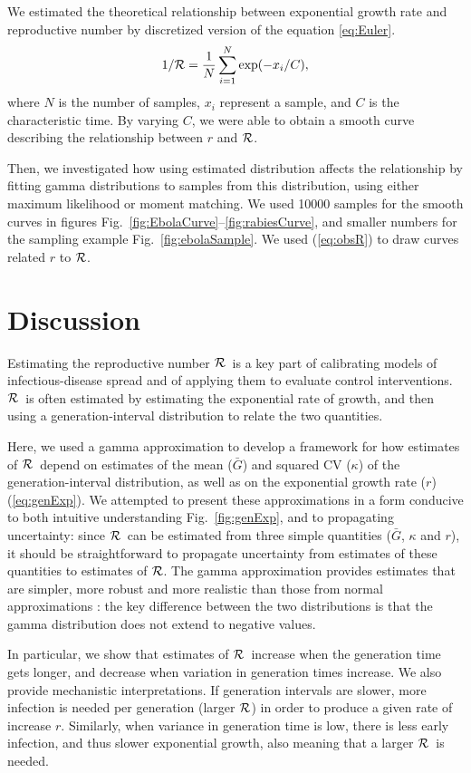 \documentclass[12pt,]{article}
\newcommand{\RR}{\ensuremath{{\cal R}}}
\newcommand{\eref}[1]{(\ref{eq:#1})}
\newcommand{\fref}[1]{Fig.~\ref{fig:#1}}
\newcommand{\frange}[2]{Fig.~\ref{fig:#1}--\ref{fig:#2}}
\begin{document}
We estimated the theoretical relationship between exponential growth rate and reproductive number by discretized version of the equation \ref{eq:Euler}.
\begin{equation}
1/\RR = \frac{1}{N} \sum_{i=1}^{N} \exp(-x_i/C),
\label{eq:obsR}
\end{equation}
where $N$ is the number of samples, $x_i$ represent a sample, and $C$ is the characteristic time. By varying $C$, we were able to obtain a smooth curve describing the relationship between $r$ and $\RR$.

Then, we investigated how using estimated distribution affects the relationship by fitting gamma distributions to samples from this distribution, using either maximum likelihood or moment matching. We used 10000 samples for the smooth curves in figures \frange{EbolaCurve}{rabiesCurve}, and smaller numbers for the sampling example \fref{ebolaSample}. We used \eref{obsR} to draw curves related $r$ to $\RR$.

\section{Discussion}

Estimating the reproductive number \RR\ is a key part of calibrating models of infectious-disease spread and of applying them to evaluate control interventions. \RR\ is often estimated by estimating the exponential rate of growth, and then using a generation-interval distribution to relate the two quantities. 

Here, we used a gamma approximation \cite{NishCast09} to develop a framework for how estimates of \RR\ depend on estimates of the mean ($\bar G$) and squared CV ($\kappa$) of the generation-interval distribution, as well as on the exponential growth rate ($r$) \eref{genExp}. 
We attempted to present these approximations in a form conducive to both intuitive understanding \fref{genExp}, and to propagating uncertainty: since \RR\ can be estimated from three simple quantities ($\bar G$, $\kappa$ and $r$), it should be straightforward to propagate uncertainty from estimates of these quantities to estimates of \RR.
The gamma approximation provides estimates that are simpler, more robust and more realistic than those from normal approximations \cite{WallLips07}:
the key difference between the two distributions is that the gamma distribution does not extend to negative values.

In particular, we show that estimates of \RR\ increase when the generation time gets longer, and decrease when variation in generation times increase. We also provide mechanistic interpretations. If generation intervals are slower, more infection is needed per generation (larger \RR)  in order to produce a given rate of increase $r$. Similarly, when variance in generation time is low, there is less early infection, and thus slower exponential growth, also meaning that a larger \RR\ is needed. 
\end{document}
